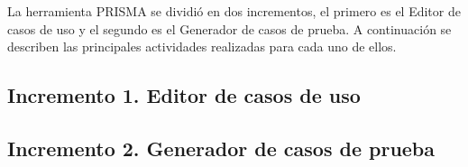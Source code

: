	La herramienta PRISMA se dividió en dos incrementos, el primero es el Editor de casos de uso y el segundo es el Generador de casos de prueba.
	A continuación se describen las principales actividades realizadas para cada uno de ellos.
	
	\subsection*{Incremento 1. Editor de casos de uso}
	
	
	\subsection*{Incremento 2. Generador de casos de prueba}
	
	

	
	
	
	